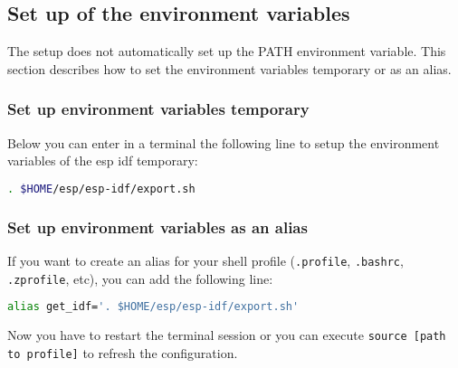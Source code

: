 \subsection{Set up of the environment variables}
The setup does not automatically set up the PATH environment variable. This section describes
how to set the environment variables temporary or as an alias. 

\subsubsection{Set up environment variables temporary}
Below you can enter in a terminal the following line to setup the environment variables of the esp idf temporary:
\begin{lstlisting}[language=bash]
. $HOME/esp/esp-idf/export.sh
\end{lstlisting} 

\cite{EspressifGetStartedsetUpTheEnvironmentVariables}

\subsubsection{Set up environment variables as an alias}
If you want to create an alias for your shell profile (\texttt{.profile}, \texttt{.bashrc}, \texttt{.zprofile}, etc), you can add the following line:
\begin{lstlisting}[language=bash]
alias get_idf='. $HOME/esp/esp-idf/export.sh'
\end{lstlisting}

Now you have to restart the terminal session or you can execute \texttt{source  [path to profile]} to refresh the configuration.\cite{EspressifGetStartedsetUpTheEnvironmentVariables}

